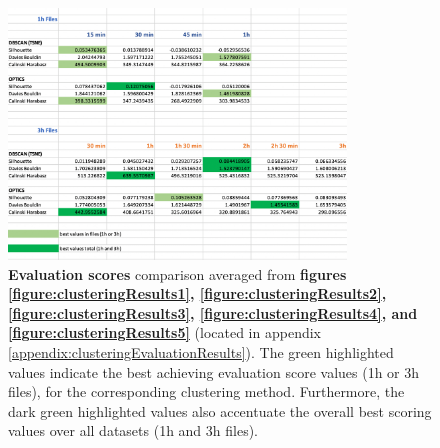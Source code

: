 \begin{figure}
  \centering
  \includegraphics[width=0.8\textwidth]{./images/clusteringResults/clusteringResults6.png}
  \caption{\textbf{Evaluation scores} comparison averaged from \textbf{figures \ref{figure:clusteringResults1}, \ref{figure:clusteringResults2}, \ref{figure:clusteringResults3}, \ref{figure:clusteringResults4}, and \ref{figure:clusteringResults5}} (located in appendix \ref{appendix:clusteringEvaluationResults}). The green highlighted values indicate the best achieving evaluation score values (1h or 3h files), for the corresponding clustering method. Furthermore, the dark green highlighted values also accentuate the overall best scoring values over all datasets (1h and 3h files).}
  \label{figure:clusteringResults6}
\end{figure}


